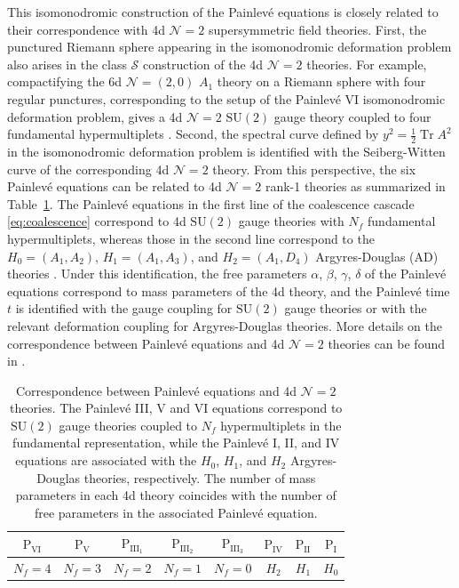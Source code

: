 \documentclass[11pt, a4paper]{article}
\DeclareMathOperator{\Tr}{Tr}
\theoremstyle{definition}
\begin{document}
This isomonodromic construction of the Painlev\'e equations is closely related to their correspondence with 4d $ \mathcal{N}=2 $ supersymmetric field theories. First, the punctured Riemann sphere appearing in the isomonodromic deformation problem also arises in the class $ \mathcal{S} $ construction of the 4d $ \mathcal{N}=2 $ theories. For example, compactifying the 6d $ \mathcal{N}=(2,0) $ $ A_1 $ theory on a Riemann sphere with four regular punctures, corresponding to the setup of the Painlev\'e VI isomonodromic deformation problem, gives a 4d $ \mathcal{N}=2 $ $ \mathrm{SU}(2) $ gauge theory coupled to four fundamental hypermultiplets \cite{Gaiotto:2009we, Gaiotto:2009hg}. Second, the spectral curve defined by $ y^2 = \frac{1}{2} \Tr A^2 $ in the isomonodromic deformation problem is identified with the Seiberg-Witten curve of the corresponding 4d $ \mathcal{N}=2 $ theory. From this perspective, the six Painlev\'e equations can be related to 4d $ \mathcal{N}=2 $ rank-1 theories as summarized in Table~\ref{table:painleve-4d}. The Painlev\'e equations in the first line of the coalescence cascade \eqref{eq:coalescence} correspond to 4d $ \mathrm{SU}(2) $ gauge theories with $ N_f $ fundamental hypermultiplets, whereas those in the second line correspond to the $ H_0=(A_1,A_2) $, $ H_1=(A_1,A_3) $, and $ H_2=(A_1,D_4) $ Argyres-Douglas (AD) theories \cite{Argyres:1995xn, Argyres:1995jj}. Under this identification, the free parameters $ \alpha $, $ \beta $, $ \gamma $, $ \delta $ of the Painlev\'e equations correspond to mass parameters of the 4d theory, and the Painlev\'e time $ t $ is identified with the gauge coupling for $ \mathrm{SU}(2) $ gauge theories or with the relevant deformation coupling for Argyres-Douglas theories. More details on the correspondence between Painlev\'e equations and 4d $ \mathcal{N}=2 $ theories can be found in \cite{Bonelli:2016qwg}.

\begin{table}
    \centering
    \begin{tabular}{cccccccc}
        $ \mathrm{P}_{\mathrm{VI}} $ & $ \mathrm{P}_{\mathrm{V}} $ & $ \mathrm{P}_{\mathrm{III}_1} $ & $ \mathrm{P}_{\mathrm{III}_2} $ & $ \mathrm{P}_{\mathrm{III}_3} $ & $ \mathrm{P}_{\mathrm{IV}} $ & $ \mathrm{P}_{\mathrm{II}} $ & $ \mathrm{P}_{\mathrm{I}} $ \\ \hline
        $ N_f=4 $ & $ N_f=3 $ & $ N_f=2 $ & $ N_f=1 $ & $ N_f=0 $ & $ H_2 $ & $ H_1 $ & $ H_0 $
    \end{tabular}
    \caption{Correspondence between Painlev\'e equations and 4d $ \mathcal{N}=2 $ theories. The Painlev\'e III, V and VI equations correspond to $ \mathrm{SU}(2) $ gauge theories coupled to $ N_f $ hypermultiplets in the fundamental representation, while the Painlev\'e I, II, and IV equations are associated with the $ H_0 $, $ H_1 $, and $ H_2 $ Argyres-Douglas theories, respectively. The number of mass parameters in each 4d theory coincides with the number of free parameters in the associated Painlev\'e equation.} \label{table:painleve-4d}
\end{table}
\end{document}
